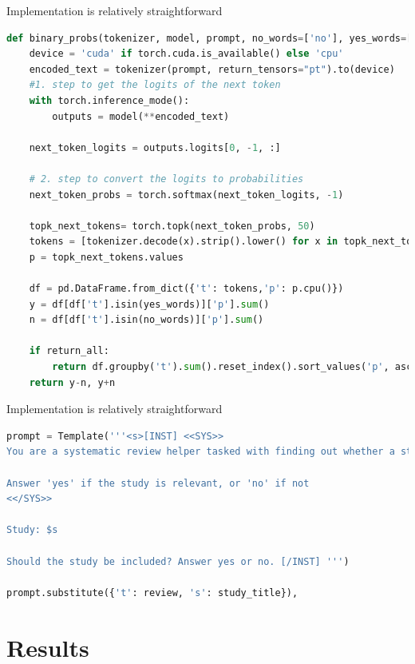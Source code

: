 \documentclass[9pt,aspectratio=169]{beamer}
\begin{document}
\begin{frame}[fragile]{Implementation is relatively straightforward}
\small
\begin{lstlisting}[language=Python]
def binary_probs(tokenizer, model, prompt, no_words=['no'], yes_words=['yes'], return_all=False):
    device = 'cuda' if torch.cuda.is_available() else 'cpu'
    encoded_text = tokenizer(prompt, return_tensors="pt").to(device)
    #1. step to get the logits of the next token
    with torch.inference_mode():
        outputs = model(**encoded_text)

    next_token_logits = outputs.logits[0, -1, :]

    # 2. step to convert the logits to probabilities
    next_token_probs = torch.softmax(next_token_logits, -1)

    topk_next_tokens= torch.topk(next_token_probs, 50)
    tokens = [tokenizer.decode(x).strip().lower() for x in topk_next_tokens.indices]
    p = topk_next_tokens.values

    df = pd.DataFrame.from_dict({'t': tokens,'p': p.cpu()})
    y = df[df['t'].isin(yes_words)]['p'].sum()
    n = df[df['t'].isin(no_words)]['p'].sum()

    if return_all:
        return df.groupby('t').sum().reset_index().sort_values('p', ascending=False).reset_index(drop=True)
    return y-n, y+n
\end{lstlisting}

\end{frame}

\begin{frame}[fragile]{Implementation is relatively straightforward}
	\small
\begin{lstlisting}[language=Python]
prompt = Template('''<s>[INST] <<SYS>>
You are a systematic review helper tasked with finding out whether a study is relevant to the review $t

Answer 'yes' if the study is relevant, or 'no' if not
<</SYS>>

Study: $s 

Should the study be included? Answer yes or no. [/INST] ''')

prompt.substitute({'t': review, 's': study_title}),
\end{lstlisting}
	
\end{frame}

\section{Results}
\end{document}
